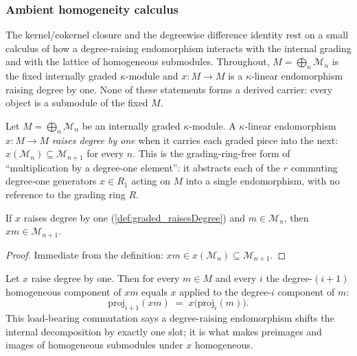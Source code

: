 \subsubsection*{Ambient homogeneity calculus}

The kernel/cokernel closure and the degreewise difference identity rest on a small
calculus of how a degree-raising endomorphism interacts with the internal grading and
with the lattice of homogeneous submodules. Throughout, \(M = \bigoplus_n \mathcal{M}_n\)
is the fixed internally graded \(\kappa\)-module and \(x : M \to M\) is a
\(\kappa\)-linear endomorphism raising degree by one. None of these statements forms a
derived carrier: every object is a submodule of the fixed \(M\).

\begin{definition}\leanok
  \label{def:graded_raisesDegree}
  Let \(M = \bigoplus_n \mathcal{M}_n\) be an internally graded \(\kappa\)-module. A
  \(\kappa\)-linear endomorphism \(x : M \to M\) \emph{raises degree by one} when it
  carries each graded piece into the next: \(x(\mathcal{M}_n) \subseteq
  \mathcal{M}_{n+1}\) for every \(n\). This is the grading-ring-free form of
  ``multiplication by a degree-one element'': it abstracts each of the \(r\)
  commuting degree-one generators \(x \in R_1\) acting on \(M\) into a single
  endomorphism, with no reference to the grading ring \(R\).
\end{definition}

\begin{lemma}\leanok
  \label{lem:graded_raisesDegree_mem}
  If \(x\) raises degree by one (\cref{def:graded_raisesDegree}) and \(m \in
  \mathcal{M}_n\), then \(x m \in \mathcal{M}_{n+1}\).
\end{lemma}

\begin{proof}
  \leanok
  Immediate from the definition: \(x m \in x(\mathcal{M}_n) \subseteq
  \mathcal{M}_{n+1}\).
\end{proof}

\begin{lemma}\leanok
  \label{lem:graded_decompose_raisesDegree}
  Let \(x\) raise degree by one. Then for every \(m \in M\) and every \(i\) the
  degree-\((i+1)\) homogeneous component of \(x m\) equals \(x\) applied to the
  degree-\(i\) component of \(m\):
  \[
    \mathrm{proj}_{i+1}(x m) \;=\; x\bigl(\mathrm{proj}_i(m)\bigr) .
  \]
  This load-bearing commutation says a degree-raising endomorphism shifts the
  internal decomposition by exactly one slot; it is what makes preimages and images
  of homogeneous submodules under \(x\) homogeneous.
\end{lemma}

